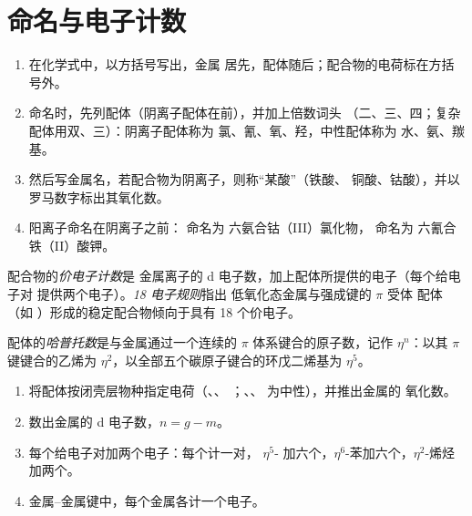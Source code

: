 \section{命名与电子计数}

\begin{method}[配合物的命名]\label{met:b2:coordination-complexes:naming}
\begin{enumerate}
  \item 在化学式中，以方括号写出，金属
        居先，配体随后；配合物的电荷标在方括号外。
  \item 命名时，先列配体（阴离子配体在前），并加上倍数词头
        （二、三、四；复杂配体用双、三）：阴离子配体称为
        氯、氰、氧、羟，中性配体称为
        水、氨、羰基。
  \item 然后写金属名，若配合物为阴离子，则称“某酸”（铁酸、
        铜酸、钴酸），并以罗马数字标出其氧化数。
  \item 阳离子命名在阴离子之前： 命名为
        六氨合钴（III）氯化物， 命名为
        六氰合铁（II）酸钾。
\end{enumerate}
\end{method}

\begin{definition}[电子计数]\label{def:b2:coordination-complexes:electron-count}
配合物的\emph{价电子计数}是
金属离子的 d 电子数，加上配体所提供的电子（每个给电子对
提供两个电子）。\emph{18 电子规则}指出
低氧化态金属与强成键的 $\pi$ 受体
配体（如 ）形成的稳定配合物倾向于具有 18 个价电子。
\end{definition}

\begin{definition}[哈普托数]\label{def:b2:coordination-complexes:hapticity}
配体的\emph{哈普托数}是与金属通过一个连续的
$\pi$ 体系键合的原子数，记作 $\eta^n$：以其 $\pi$ 键键合的乙烯为
$\eta^2$，以全部五个碳原子键合的环戊二烯基为 $\eta^5$。
\end{definition}

\begin{method}[电子计数]\label{met:b2:coordination-complexes:electron-count}
\begin{enumerate}
  \item 将配体按闭壳层物种指定电荷（、、
        ；、、 为中性），并推出金属的
        氧化数。
  \item 数出金属的 d 电子数，$n = g - m$。
  \item 每个给电子对加两个电子：每个计一对，
        $\eta^5$- 加六个，$\eta^6$-苯加六个，$\eta^2$-烯烃加两个。
  \item 金属–金属键中，每个金属各计一个电子。
\end{enumerate}
\end{method}

